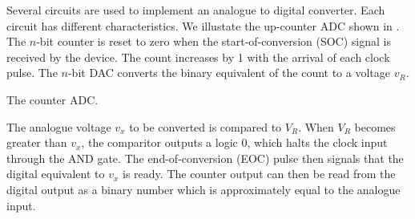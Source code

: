 \begin{slide}\label{slide:compare}
\begin{center}
\end{center}
\end{slide}

Several circuits are used to implement an analogue to digital
converter. Each circuit has different characteristics. We illustate
the up-counter ADC shown in . The $n$-bit counter is
reset to zero when the start-of-conversion (SOC) signal is received by
the device. The count increases by 1 with the arrival of each clock
pulse. The $n$-bit DAC converts the binary equivalent of the count to
a voltage $v_R$. 

\begin{slide}\label{slide:ADC}
The counter ADC.
\begin{center}
\end{center}
\end{slide}

The analogue voltage $v_x$ to be converted is compared to $V_R$. When
$V_R$ becomes greater than $v_x$, the comparitor outputs a logic 0,
which halts the clock input through the AND gate. The
end-of-conversion (EOC) pulse then signals that the digital equivalent
to $v_x$ is ready. The counter output can then be read from the
digital output as a binary number which is approximately equal to the
analogue input.

